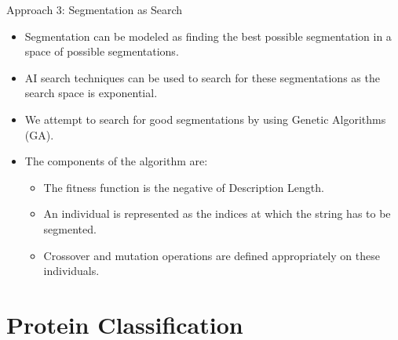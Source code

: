 \documentclass{beamer}
\begin{document}
\begin{frame}{Approach 3: Segmentation as Search}
	\begin{itemize}
		\item Segmentation can be modeled as finding the best possible segmentation in a space of possible segmentations.
		\item AI search techniques can be used to search for these segmentations as the search space is exponential.
		\item We attempt to search for good segmentations by using Genetic Algorithms (GA).
		\item The components of the algorithm are:
		\begin{itemize}
			\item The fitness function is the negative of Description Length.
			\item An individual is represented as the indices at which the string has to be segmented.
			\item Crossover and mutation operations are defined appropriately on these individuals.
		\end{itemize} 
	\end{itemize}
\end{frame}

\section{Protein Classification}
\end{document}
